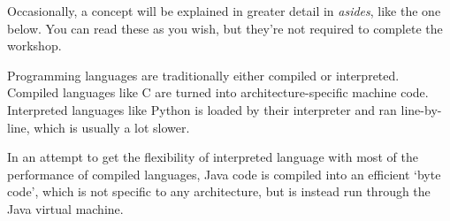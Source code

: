 Occasionally, a concept will be explained in greater detail in \textit{asides}, like the one below. You can read these as you wish, but they're not required to complete the workshop.
	
\begin{aside}
	Programming languages are traditionally either compiled or interpreted. Compiled languages like C are turned into architecture-specific machine code. Interpreted languages like Python is loaded by their interpreter and ran line-by-line, which is usually a lot slower.
	
	In an attempt to get the flexibility of interpreted language with most of the performance of compiled languages, Java code is compiled into an efficient `byte code', which is not specific to any architecture, but is instead run through the Java virtual machine.
\end{aside}